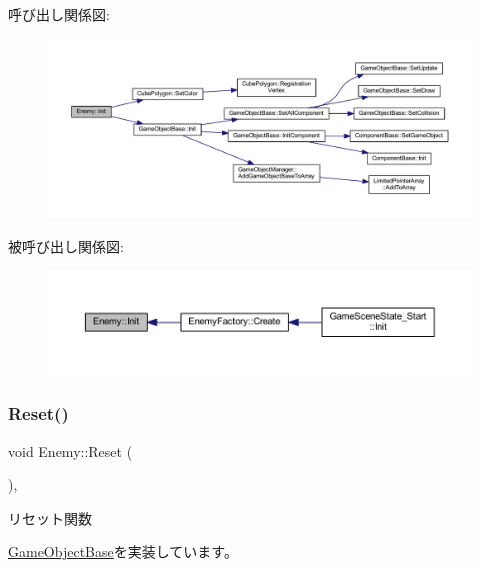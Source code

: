 呼び出し関係図\+:\nopagebreak
\begin{figure}[H]
\begin{center}
\leavevmode
\includegraphics[width=350pt]{class_enemy_a678f73f8af13e1bc55be3fdad2608399_cgraph}
\end{center}
\end{figure}
被呼び出し関係図\+:\nopagebreak
\begin{figure}[H]
\begin{center}
\leavevmode
\includegraphics[width=350pt]{class_enemy_a678f73f8af13e1bc55be3fdad2608399_icgraph}
\end{center}
\end{figure}
\mbox{\label{class_enemy_ab86571061e7fcabcf8c646b1abad5581}} 
\subsubsection{\texorpdfstring{Reset()}{Reset()}}
{\footnotesize\ttfamily void Enemy\+::\+Reset (\begin{DoxyParamCaption}{ }\end{DoxyParamCaption})\hspace{0.3cm}{\ttfamily [override]}, {\ttfamily [virtual]}}



リセット関数 



\mbox{\hyperlink{class_game_object_base_a85c59554f734bcb09f1a1e18d9517dce}{Game\+Object\+Base}}を実装しています。



